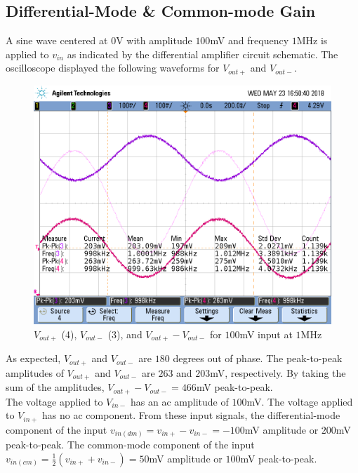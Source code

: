\subsection{Differential-Mode \& Common-mode Gain}

A sine wave centered at $0$\si{\volt} with amplitude $100$\si{\milli\volt} and frequency $1$\si{\mega\hertz} is applied to $v_{in}$ as indicated by the differential amplifier circuit schematic. 
The oscilloscope displayed the following waveforms for $V_{out+}$ and $V_{out-}$.

\FloatBarrier

\begin{figure}[h!]
	\centering
	\includegraphics[scale=0.60]{./images/scope_5}
	\caption{$V_{out+}$ (4), $V_{out-}$ (3), and $V_{out+} - V_{out-}$ for $100$\si{\milli\volt} input at $1$\si{\mega\hertz}}
	\label{fig:scope_5}
\end{figure}

\FloatBarrier

As expected, $V_{out+}$ and $V_{out-}$ are $180$ degrees out of phase.
The peak-to-peak amplitudes of $V_{out+}$ and $V_{out-}$ are $263$ and $203$\si{\milli\volt}, respectively.
By taking the sum of the amplitudes, $V_{out+} - V_{out-} = 466$\si{\milli\volt} peak-to-peak. \\

The voltage applied to $V_{in-}$ has an ac amplitude of $100$\si{\milli\volt}.
The voltage applied to $V_{in+}$ has no ac component.
From these input signals, the differential-mode component of the input $v_{in(dm)} = v_{in+} - v_{in-} = -100$\si{\milli\volt} amplitude or $200$\si{\milli\volt} peak-to-peak.
The common-mode component of the input $v_{in(cm)} = \frac{1}{2}(v_{in+} + v_{in-}) = 50$\si{\milli\volt} amplitude or $100$\si{\milli\volt} peak-to-peak. \\

